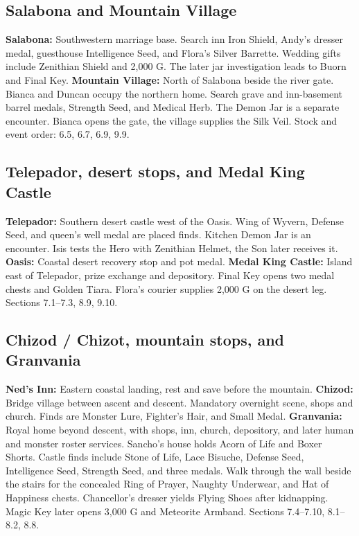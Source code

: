 \subsection{Salabona and Mountain Village}
\textbf{Salabona:} Southwestern marriage base. Search inn Iron Shield, Andy's dresser medal, guesthouse Intelligence Seed, and Flora's Silver Barrette. Wedding gifts include Zenithian Shield and 2,000 G. The later jar investigation leads to Buorn and Final Key. \textbf{Mountain Village:} North of Salabona beside the river gate. Bianca and Duncan occupy the northern home. Search grave and inn-basement barrel medals, Strength Seed, and Medical Herb. The Demon Jar is a separate encounter. Bianca opens the gate, the village supplies the Silk Veil. Stock and event order: 6.5, 6.7, 6.9, 9.9.

\subsection{Telepador, desert stops, and Medal King Castle}
\textbf{Telepador:} Southern desert castle west of the Oasis. Wing of Wyvern, Defense Seed, and queen's well medal are placed finds. Kitchen Demon Jar is an encounter. Isis tests the Hero with Zenithian Helmet, the Son later receives it. \textbf{Oasis:} Coastal desert recovery stop and pot medal. \textbf{Medal King Castle:} Island east of Telepador, prize exchange and depository. Final Key opens two medal chests and Golden Tiara. Flora's courier supplies 2,000 G on the desert leg. Sections 7.1--7.3, 8.9, 9.10.

\subsection{Chizod / Chizot, mountain stops, and Granvania}
\textbf{Ned's Inn:} Eastern coastal landing, rest and save before the mountain. \textbf{Chizod:} Bridge village between ascent and descent. Mandatory overnight scene, shops and church. Finds are Monster Lure, Fighter's Hair, and Small Medal. \textbf{Granvania:} Royal home beyond descent, with shops, inn, church, depository, and later human and monster roster services. Sancho's house holds Acorn of Life and Boxer Shorts. Castle finds include Stone of Life, Lace Bisuche, Defense Seed, Intelligence Seed, Strength Seed, and three medals. Walk through the wall beside the stairs for the concealed Ring of Prayer, Naughty Underwear, and Hat of Happiness chests. Chancellor's dresser yields Flying Shoes after kidnapping. Magic Key later opens 3,000 G and Meteorite Armband. Sections 7.4--7.10, 8.1--8.2, 8.8.

